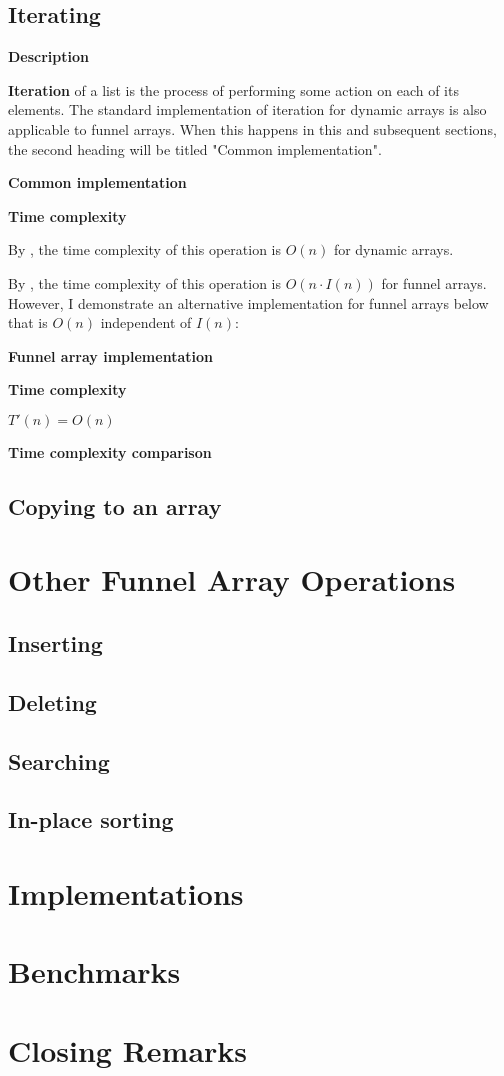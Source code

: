 \documentclass{article}
\newcommand{\descriptn}{\textbf{Description}}
\newcommand{\funarrayimpl}{\textbf{Funnel array implementation}}
\newcommand{\commimpltext}{Common implementation}
\newcommand{\commimpl}{\textbf{\commimpltext}}
\newcommand{\tcomplex}{\textbf{Time complexity}}
\newcommand{\tcomplexcmp}{\textbf{Time complexity comparison}}
\newcommand{\timefn}{T}
\newcommand{\timenewfn}{\timefn'}
\newcommand{\bigo}{O}
\newcommand{\varnitems}{n}
\newcommand{\indexertime}{I}
\begin{document}
	\subsection{Iterating}
	
	\descriptn
	
	\textbf{Iteration} of a list is the process of performing some action on each of its elements. The standard implementation of iteration for dynamic arrays is also applicable to funnel arrays. When this happens in this and subsequent sections, the second heading will be titled "\commimpltext".
	
	\commimpl
	
	\tcomplex
	
	By , the time complexity of this operation is $\bigo(\varnitems)$ for dynamic arrays.
	
	By , the time complexity of this operation is $\bigo(\varnitems \cdot \indexertime(\varnitems))$ for funnel arrays. However, I demonstrate an alternative implementation for funnel arrays below that is $\bigo(\varnitems)$ independent of $\indexertime(\varnitems)$:
	
	\funarrayimpl
	
	
	
	\tcomplex
	
	$\timenewfn(\varnitems) = \bigo(\varnitems)$
	
	\tcomplexcmp
	
	\subsection{Copying to an array}
	
	\section{Other Funnel Array Operations}
	
	\subsection{Inserting}
	
	\subsection{Deleting}
	
	\subsection{Searching}
	
	\subsection{In-place sorting}
	
	\section{Implementations}
	
	\section{Benchmarks}
	
	\section{Closing Remarks}
\end{document}
